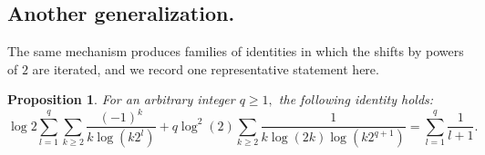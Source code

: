 \documentclass[11pt,oneside,reqno]{article}
\newtheorem*{proposition}{Proposition}
\theoremstyle{definition}
\begin{document}
\subsection{Another generalization.}
The same mechanism produces families of identities in which the shifts by powers of $2$ are iterated, and we record one representative statement here.

\begin{proposition}
For an arbitrary integer $q \ge 1,$ the following identity holds:
\begin{equation}
\log2 \sum_{l=1}^q
\sum_{k\ge2}\frac{\left(-1\right)^{k}}{k
\log\left(k2^l\right)}
+q\log^2(2)\sum_{k\ge2}\frac{1}{k
\log\left(2k\right)
\log\left(k2^{q+1}\right)}=\sum_{l=1}^q \frac{1}{l+1}.
\end{equation}

\end{proposition}
\end{document}
